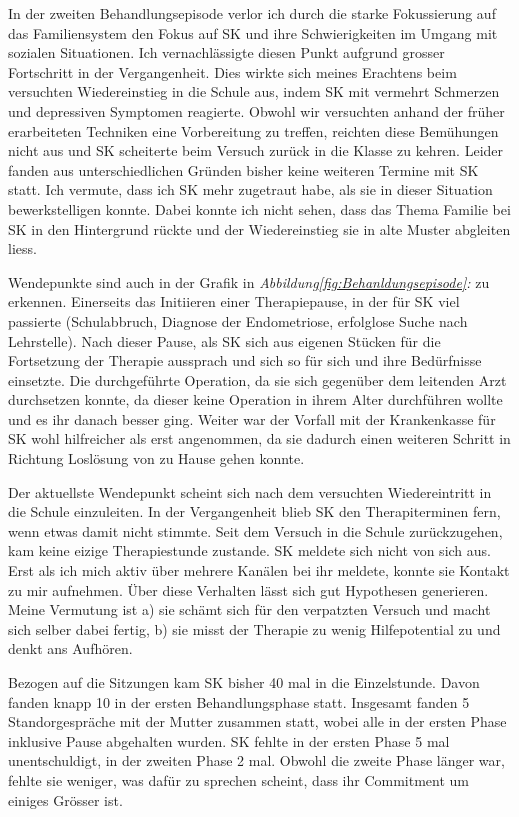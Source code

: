 In der zweiten Behandlungsepisode verlor ich durch die starke Fokussierung auf das Familiensystem  den Fokus auf SK und ihre Schwierigkeiten im Umgang mit sozialen Situationen. Ich vernachlässigte diesen Punkt aufgrund grosser Fortschritt in der Vergangenheit. Dies wirkte sich meines Erachtens beim versuchten Wiedereinstieg in die Schule aus, indem SK mit vermehrt Schmerzen und depressiven Symptomen reagierte. Obwohl wir versuchten anhand der früher erarbeiteten Techniken eine Vorbereitung zu treffen, reichten diese Bemühungen nicht aus und SK scheiterte beim Versuch zurück in die Klasse zu kehren. Leider fanden aus unterschiedlichen Gründen bisher keine weiteren Termine mit SK statt. Ich vermute, dass ich SK mehr zugetraut habe, als sie in dieser Situation bewerkstelligen konnte. Dabei konnte ich nicht sehen, dass das Thema Familie bei SK in den Hintergrund rückte und der Wiedereinstieg sie in alte Muster abgleiten liess.

Wendepunkte sind auch in der Grafik in \textit{Abbildung\ref{fig:Behanldungsepisode}: } zu erkennen. Einerseits das Initiieren einer Therapiepause, in der für SK viel passierte (Schulabbruch, Diagnose der Endometriose, erfolglose Suche nach Lehrstelle). Nach dieser Pause, als SK sich aus eigenen Stücken für die Fortsetzung der Therapie aussprach und sich so für sich und ihre Bedürfnisse einsetzte. Die durchgeführte Operation, da sie sich gegenüber dem leitenden Arzt durchsetzen konnte, da dieser keine Operation in ihrem Alter durchführen wollte und es ihr danach besser ging. Weiter war der Vorfall mit der Krankenkasse für SK wohl hilfreicher als erst angenommen, da sie dadurch einen weiteren Schritt in Richtung Loslösung von zu Hause gehen konnte. 

Der aktuellste Wendepunkt scheint sich nach dem versuchten Wiedereintritt in die Schule einzuleiten. In der Vergangenheit blieb SK den Therapiterminen fern, wenn etwas damit nicht stimmte. Seit dem Versuch in die Schule zurückzugehen, kam keine eizige Therapiestunde zustande. SK meldete sich nicht von sich aus. Erst als ich mich aktiv über mehrere Kanälen bei ihr meldete, konnte sie Kontakt zu mir aufnehmen. Über diese Verhalten lässt sich gut Hypothesen generieren. Meine Vermutung ist a) sie schämt sich für den verpatzten Versuch und macht sich selber dabei fertig, b) sie misst der Therapie zu wenig Hilfepotential zu und denkt ans Aufhören.

Bezogen auf die Sitzungen kam SK bisher 40 mal in die Einzelstunde. Davon fanden knapp 10 in der ersten Behandlungsphase statt. Insgesamt fanden 5 Standorgespräche mit der Mutter zusammen statt, wobei alle in der ersten Phase inklusive Pause abgehalten wurden. SK fehlte in der ersten Phase 5 mal unentschuldigt, in der zweiten Phase 2 mal. Obwohl die zweite Phase länger war, fehlte sie weniger, was dafür zu sprechen scheint, dass ihr Commitment um einiges Grösser ist.

